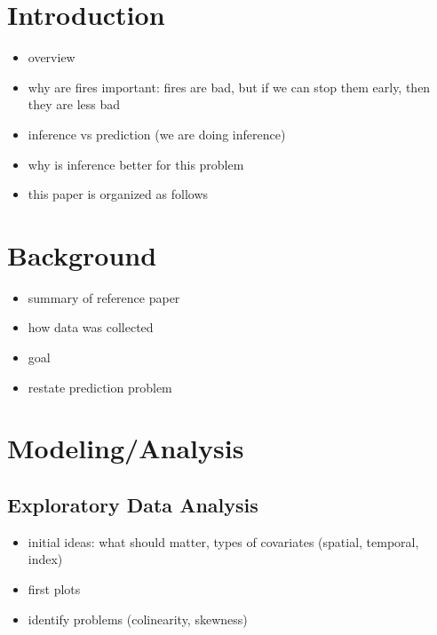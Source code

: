 \documentclass{article}
\begin{document}
\begin{abstract}

\end{abstract}

\section{Introduction}

\begin{itemize}

\item overview
\item why are fires important: fires are bad, but if we can stop them early, then they are less bad
\item inference vs prediction (we are doing inference)
\item why is inference better for this problem
\item this paper is organized as follows

\end{itemize}

\section{Background}

\begin{itemize}

\item summary of reference paper
\item how data was collected
\item goal
\item restate prediction problem

\end{itemize}

\section{Modeling/Analysis}

\subsection{Exploratory Data Analysis}

\begin{itemize}

\item initial ideas: what should matter, types of covariates (spatial, temporal, index)
\item first plots
\item identify problems (colinearity, skewness)

\end{itemize}
\end{document}
